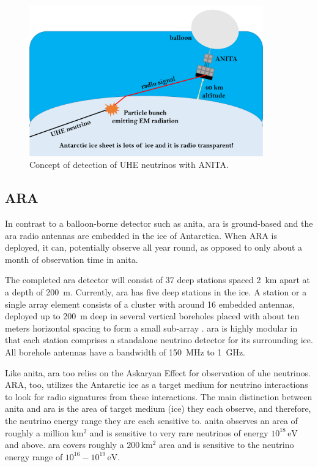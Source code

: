 \begin{figure}
\centering
\includegraphics[width=0.9\textwidth]{figures/anita_cartoon_updated.png}
\caption{Concept of detection of UHE neutrinos with ANITA.}
\label{anita_cartoon}
\end{figure}

\subsection{ARA} 

In contrast to a balloon-borne detector such as \gls{anita}, \gls{ara} is ground-based and the \gls{ara} radio antennas are embedded in the ice of Antarctica. When ARA is deployed, it can, potentially observe all year round, as opposed to only about a month of observation time in \gls{anita}. 

The completed \gls{ara} detector will consist of 37 deep stations spaced 2~km apart at a depth of 200~m. Currently, \gls{ara} has five deep stations in the ice. A station or a single array element consists of a cluster with around 16 embedded antennas, deployed up to 200~m deep in several vertical boreholes placed with about ten meters horizontal spacing to form a small sub-array \cite{arahardware}. \gls{ara} is highly modular in that each station comprises a standalone neutrino detector for its surrounding ice. All borehole antennas have a bandwidth of 150~MHz to 1~GHz.

Like \gls{anita}, \gls{ara} too relies on the Askaryan Effect \cite{askaryan} for observation of \gls{uhe} neutrinos. ARA, too, utilizes the Antarctic ice as a target medium for neutrino interactions to look for radio signatures from these interactions. The main distinction between \gls{anita} and \gls{ara} is the area of target medium (ice) they each observe, and therefore, the neutrino energy range they are each sensitive to. \gls{anita} observes an area of roughly a million $\mathrm{km^2}$ and is sensitive to very rare neutrinos of energy $10^{18} \, \mathrm{eV}$ and above. \gls{ara} covers roughly a $200 \, \mathrm{km^2}$ area and is sensitive to the neutrino energy range of $10^{16} - 10^{19}\, \mathrm{eV}$. 

